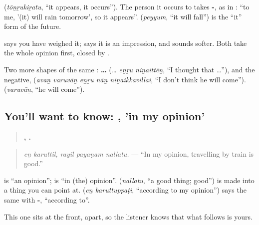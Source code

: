 \textbf{} (\emph{tōṉṟukiṟatu}, \textquotedblleft{}it appears, it occurs\textquotedblright{}). The person it occurs to takes \textbf{-}, as in \textbf{  }: \textquotedblleft{}to me, '(it) will rain tomorrow', so it appears\textquotedblright{}. \textbf{} (\emph{peyyum}, \textquotedblleft{}it will fall\textquotedblright{}) is the \textquotedblleft{}it\textquotedblright{} form of the future.

\textbf{} says you have weighed it; \textbf{} says it is an impression, and sounds softer. Both take the whole opinion first, closed by \textbf{}.

Two more shapes of the same \textbf{}: \textbf{…  } (\emph{… eṉṟu niṉaittēṉ}, \textquotedblleft{}I thought that …\textquotedblright{}), and the negative, \textbf{    } (\emph{avaṉ varuvāṉ eṉṟu nāṉ niṉaikkavillai}, \textquotedblleft{}I don't think he will come\textquotedblright{}). \textbf{} (\emph{varuvāṉ}, \textquotedblleft{}he will come\textquotedblright{}).

\subsection*{You'll want to know:  , 'in my opinion'}
\begin{quote}
\textbf{ ,   .}
\end{quote}

\begin{quote}
\emph{eṉ karuttil, rayil payaṇam nallatu.} — \textquotedblleft{}In my opinion, travelling by train is good.\textquotedblright{}
\end{quote}

\textbf{} is \textquotedblleft{}an opinion\textquotedblright{}; \textbf{} is \textquotedblleft{}in (the) opinion\textquotedblright{}. \textbf{} (\emph{nallatu}, \textquotedblleft{}a good thing; good\textquotedblright{}) is \textbf{} made into a thing you can point at. \textbf{ } (\emph{eṉ karuttuppaṭi}, \textquotedblleft{}according to my opinion\textquotedblright{}) says the same with \textbf{-}, \textquotedblleft{}according to\textquotedblright{}.

This one sits at the front, apart, so the listener knows that what follows is yours.

